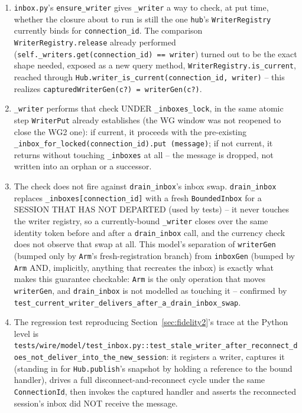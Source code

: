 \documentclass[a4paper,10pt,fleqn]{article}
\begin{document}
\begin{enumerate}
  \item \texttt{inbox.py}'s \texttt{ensure\_writer} gives \texttt{\_writer} a
    way to check, at put time, whether the closure about to run is still the
    one \texttt{hub}'s \texttt{WriterRegistry} currently binds for
    \texttt{connection\_id}. The comparison \texttt{WriterRegistry.release}
    already performed (\texttt{self.\_writers.get(connection\_id) ==
    writer}) turned out to be the exact shape needed, exposed as a new query
    method, \texttt{WriterRegistry.is\_current}, reached through
    \texttt{Hub.writer\_is\_current(connection\_id, writer)} -- this realizes
    \texttt{capturedWriterGen(c?) = writerGen(c?)}.
  \item \texttt{\_writer} performs that check UNDER \texttt{\_inboxes\_lock},
    in the same atomic step \texttt{WriterPut} already establishes (the WG
    window was not reopened to close the WG2 one): if current, it proceeds
    with the pre-existing \texttt{\_inbox\_for\_locked(connection\_id).put
    (message)}; if not current, it returns without touching
    \texttt{\_inboxes} at all -- the message is dropped, not written into an
    orphan or a successor.
  \item The check does not fire against \texttt{drain\_inbox}'s inbox swap.
    \texttt{drain\_inbox} replaces \texttt{\_inboxes[connection\_id]} with a
    fresh \texttt{BoundedInbox} for a SESSION THAT HAS NOT DEPARTED (used by
    tests) -- it never touches the writer registry, so a currently-bound
    \texttt{\_writer} closes over the same identity token before and after a
    \texttt{drain\_inbox} call, and the currency check does not observe that
    swap at all. This model's separation of \texttt{writerGen} (bumped only
    by \texttt{Arm}'s fresh-registration branch) from \texttt{inboxGen}
    (bumped by \texttt{Arm} AND, implicitly, anything that recreates the
    inbox) is exactly what makes this guarantee checkable: \texttt{Arm} is
    the only operation that moves \texttt{writerGen}, and \texttt{drain\_inbox}
    is not modelled as touching it -- confirmed by
    \texttt{test\_current\_writer\_delivers\_after\_a\_drain\_inbox\_swap}.
  \item The regression test reproducing Section~\ref{sec:fidelity2}'s trace
    at the Python level is
    \texttt{tests/wire/model/test\_inbox.py::test\_stale\_writer\_after\_reconnect\_does\_not\_deliver\_into\_the\_new\_session}:
    it registers a writer, captures it (standing in for \texttt{Hub.publish}'s
    snapshot by holding a reference to the bound handler), drives a full
    disconnect-and-reconnect cycle under the same \texttt{ConnectionId}, then
    invokes the captured handler and asserts the reconnected session's inbox
    did NOT receive the message.
\end{enumerate}
\end{document}
